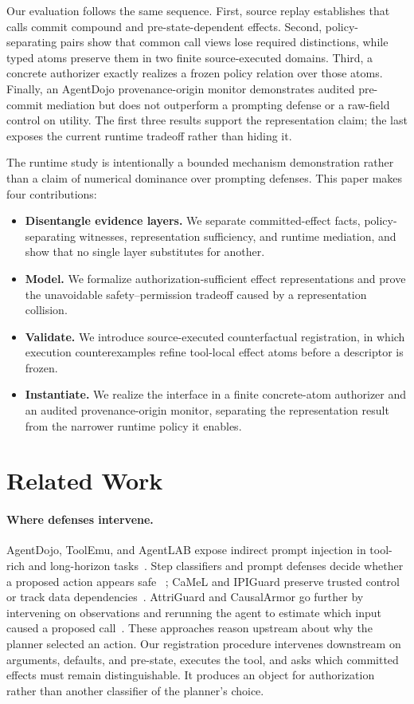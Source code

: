 \documentclass[letterpaper,twocolumn,10pt]{article}
\theoremstyle{definition}
\begin{document}
Our evaluation follows the same sequence.  First, source replay establishes
that calls commit compound and pre-state-dependent effects.  Second,
policy-separating pairs show that common call views lose required distinctions,
while typed atoms preserve them in two finite source-executed domains.  Third,
a concrete authorizer exactly realizes a frozen policy relation over those
atoms.  Finally, an AgentDojo provenance-origin monitor demonstrates audited
pre-commit mediation but does not outperform a prompting defense or a raw-field
control on utility.  The first three results support the representation claim;
the last exposes the current runtime tradeoff rather than hiding it.

The runtime study is intentionally a bounded mechanism demonstration rather
than a claim of numerical dominance over prompting defenses.  This paper makes
four contributions:
\begin{itemize}[leftmargin=*]
  \item \textbf{Disentangle evidence layers.} We separate committed-effect
  facts, policy-separating witnesses, representation sufficiency, and runtime
  mediation, and show that no single layer substitutes for another.
  \item \textbf{Model.} We formalize authorization-sufficient effect
  representations and prove the unavoidable safety--permission tradeoff
  caused by a representation collision.
  \item \textbf{Validate.} We introduce source-executed counterfactual
  registration, in which execution counterexamples refine tool-local effect
  atoms before a descriptor is frozen.
  \item \textbf{Instantiate.} We realize the interface in a finite
  concrete-atom authorizer and an audited provenance-origin monitor, separating
  the representation result from the narrower runtime policy it enables.
\end{itemize}

\section{Related Work}
\label{sec:related-work}

\paragraph{Where defenses intervene.}
AgentDojo, ToolEmu, and AgentLAB expose indirect prompt injection in tool-rich
and long-horizon tasks~\cite{agentdojo,toolemu,agentlab}.  Step classifiers and
prompt defenses decide whether a proposed action appears safe
~\cite{toolsafe,safiron}; CaMeL and IPIGuard preserve trusted control or track
data dependencies~\cite{camel,ipiguard}.  AttriGuard and CausalArmor go further
by intervening on observations and rerunning the agent to estimate which input
caused a proposed call~\cite{attriguard,causalarmor}.  These approaches reason
upstream about why the planner selected an action.  Our registration procedure
intervenes downstream on arguments, defaults, and pre-state, executes the tool,
and asks which committed effects must remain distinguishable.  It produces an
object for authorization rather than another classifier of the planner's
choice.
\end{document}
